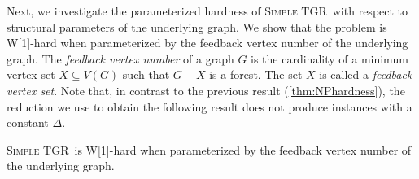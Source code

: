 \documentclass[a4paper,UKenglish,cleveref, autoref, thm-restate]{lipics-v2021}
\newcommand{\deltaExact}{\textsc{Simple TGR}}
\begin{document}

Next, we investigate the parameterized hardness of \deltaExact\ with respect to structural parameters of the underlying graph. We show that the problem is W[1]-hard when parameterized by the feedback vertex number of the underlying graph. 
The \emph{feedback vertex number} of a graph $G$ is the cardinality of a minimum vertex set $X\subseteq V(G)$ such that $G-X$ is a forest. The set $X$ is called a \emph{feedback vertex set}. 
Note that, in contrast to the previous result (\cref{thm:NPhardness}), the reduction we use to obtain the following result does not produce instances with a constant $\Delta$.

\begin{theorem}[$\star$]\label{thm:W1wrtFVS}
    \deltaExact\ is W[1]-hard when parameterized by the feedback vertex number of the underlying graph.
\end{theorem}
\end{document}
